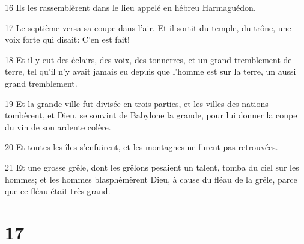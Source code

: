 \par 16 Ils les rassemblèrent dans le lieu appelé en hébreu Harmaguédon.
\par 17 Le septième versa sa coupe dans l'air. Et il sortit du temple, du trône, une voix forte qui disait: C'en est fait!
\par 18 Et il y eut des éclairs, des voix, des tonnerres, et un grand tremblement de terre, tel qu'il n'y avait jamais eu depuis que l'homme est sur la terre, un aussi grand tremblement.
\par 19 Et la grande ville fut divisée en trois parties, et les villes des nations tombèrent, et Dieu, se souvint de Babylone la grande, pour lui donner la coupe du vin de son ardente colère.
\par 20 Et toutes les îles s'enfuirent, et les montagnes ne furent pas retrouvées.
\par 21 Et une grosse grêle, dont les grêlons pesaient un talent, tomba du ciel sur les hommes; et les hommes blasphémèrent Dieu, à cause du fléau de la grêle, parce que ce fléau était très grand.

\chapter{17}

